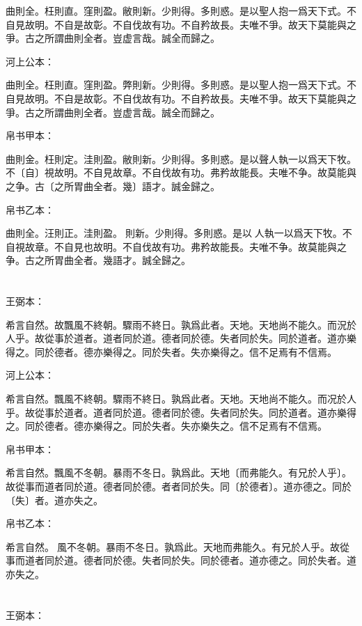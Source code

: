 \documentclass[a5paper]{ctexbook}
\begin{document}
    曲則全。枉則直。窪則盈。敝則新。少則得。多則惑。是以聖人抱一爲天下式。不自見故明。不自是故彰。不自伐故有功。不自矜故長。夫唯不爭。故天下莫能與之爭。古之所謂曲則全者。豈虚言哉。誠全而歸之。

    河上公本：

    曲則全。枉則直。窪則盈。弊則新。少則得。多則惑。是以聖人抱一爲天下式。不自見故明。不自是故彰。不自伐故有功。不自矜故長。夫唯不爭。故天下莫能與之爭。古之所謂曲則全者。豈虚言哉。誠全而歸之。

    帛书甲本：

    曲則金。枉則定。洼則盈。敝則新。少則得。多則惑。是以聲人執一以爲天下牧。不〔自〕視故明。不自見故章。不自伐故有功。弗矜故能長。夫唯不争。故莫能與之争。古〔之所胃曲全者。幾〕語才。誠金歸之。

    帛书乙本：

    曲則全。汪則正。洼則盈。𧝬則新。少則得。多則惑。是以𦔻人執一以爲天下牧。不自視故章。不自見也故明。不自伐故有功。弗矜故能長。夫唯不争。故莫能與之争。古之所胃曲全者。幾語才。誠全歸之。

    \chapter{}
    王弼本：

    希言自然。故飄風不終朝。驟雨不終日。孰爲此者。天地。天地尚不能久。而況於人乎。故從事於道者。道者同於道。德者同於德。失者同於失。同於道者。道亦樂得之。同於德者。德亦樂得之。同於失者。失亦樂得之。信不足焉有不信焉。

    河上公本：

    希言自然。飄風不終朝。驟雨不終日。孰爲此者。天地。天地尚不能久。而况於人乎。故從事於道者。道者同於道。德者同於德。失者同於失。同於道者。道亦樂得之。同於德者。德亦樂得之。同於失者。失亦樂失之。信不足焉有不信焉。

    帛书甲本：

    希言自然。飄風不冬朝。暴雨不冬日。孰爲此。天地〔而弗能久。有兄於人乎〕。故從事而道者同於道。德者同於德。者者同於失。同〔於德者〕。道亦德之。同於〔失〕者。道亦失之。

    帛书乙本：

    希言自然。𠠕風不冬朝。暴雨不冬日。孰爲此。天地而弗能久。有兄於人乎。故從事而道者同於道。德者同於德。失者同於失。同於德者。道亦德之。同於失者。道亦失之。

    \chapter{}
    王弼本：
\end{document}
